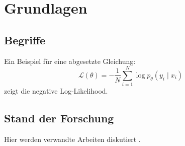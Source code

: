 \chapter{Grundlagen}
\label{ch:grundlagen}

\section{Begriffe}
Ein Beispiel für eine abgesetzte Gleichung:
\begin{equation}
  \mathcal{L}(\theta) = -\frac{1}{N}\sum_{i=1}^{N} \log p_\theta\left(y_i \mid x_i\right)
  \label{eq:loss}
\end{equation}
 zeigt die negative Log-Likelihood.

\section{Stand der Forschung}
Hier werden verwandte Arbeiten diskutiert \citep{knuth1984texbook, lamport1994latex}.
